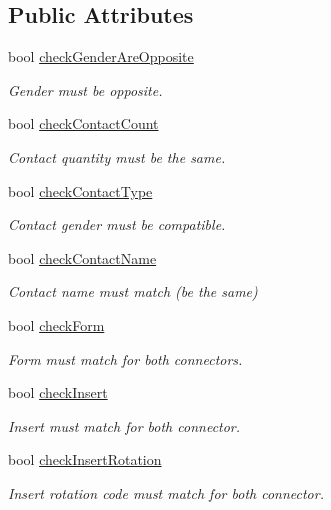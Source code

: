 \subsection*{Public Attributes}
\begin{DoxyCompactItemize}
\item 
bool \hyperlink{structmdt_cl_connectable_criteria_a540f153bd5b6c9d05ab9587438365c8d}{check\-Gender\-Are\-Opposite}
\begin{DoxyCompactList}\small\item\em Gender must be opposite. \end{DoxyCompactList}\item 
bool \hyperlink{structmdt_cl_connectable_criteria_a96b240355fc97c31a72eba946614e261}{check\-Contact\-Count}
\begin{DoxyCompactList}\small\item\em Contact quantity must be the same. \end{DoxyCompactList}\item 
bool \hyperlink{structmdt_cl_connectable_criteria_ad37109313f47acdc63331bd744df38a4}{check\-Contact\-Type}
\begin{DoxyCompactList}\small\item\em Contact gender must be compatible. \end{DoxyCompactList}\item 
bool \hyperlink{structmdt_cl_connectable_criteria_a216681c69f5674cf5011bc00cd0170dd}{check\-Contact\-Name}
\begin{DoxyCompactList}\small\item\em Contact name must match (be the same) \end{DoxyCompactList}\item 
bool \hyperlink{structmdt_cl_connectable_criteria_ad4487b3b17f90f28023afefbfde78842}{check\-Form}
\begin{DoxyCompactList}\small\item\em Form must match for both connectors. \end{DoxyCompactList}\item 
bool \hyperlink{structmdt_cl_connectable_criteria_a563935ae7679899d23ba67e0f49c0f5e}{check\-Insert}
\begin{DoxyCompactList}\small\item\em Insert must match for both connector. \end{DoxyCompactList}\item 
bool \hyperlink{structmdt_cl_connectable_criteria_a78661312682c0421bbc2b50255bb0229}{check\-Insert\-Rotation}
\begin{DoxyCompactList}\small\item\em Insert rotation code must match for both connector. \end{DoxyCompactList}\end{DoxyCompactItemize}


